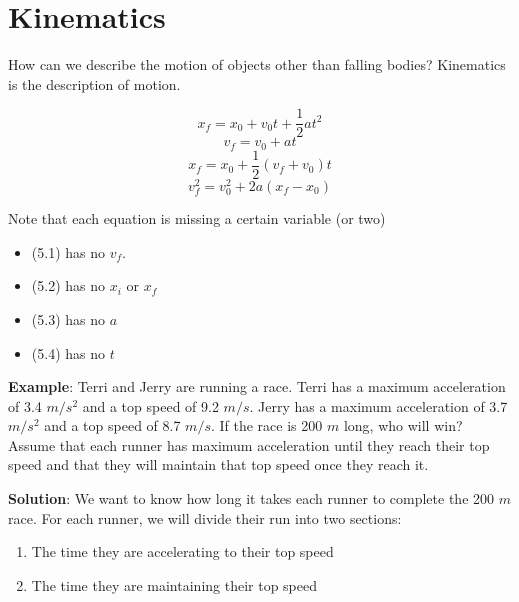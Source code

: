 \chapter{Kinematics}

How can we describe the motion of objects other than falling bodies? Kinematics 
is the description of motion. 



\begin{mdframed}[style=important]
\begin{equation}
    x_f = x_0 + v_0 t + \frac{1}{2}at^2
\end{equation}
\begin{equation}
    v_f = v_0 + at
\end{equation}
\begin{equation}
    x_f = x_0 + \frac{1}{2}\left(v_f + v_0 \right)t
\end{equation}
\begin{equation}
    v_f^2 = v_0^2 + 2a\left(x_f - x_0 \right)
\end{equation}
\end{mdframed}




Note that each equation is missing a certain variable (or two)
\begin{itemize}
    \item (5.1) has no $v_f$. 
    \item (5.2) has no $x_i$ or $x_f$
    \item (5.3) has no $a$
    \item (5.4) has no $t$
\end{itemize} 

\textbf{Example}: Terri and Jerry are running a race. Terri has a maximum 
acceleration of 3.4 $m/s^2$ and a top speed of 9.2 $m/s$. Jerry has a maximum 
acceleration of 3.7 $m/s^2$ and a top speed of 8.7 $m/s$. If the race is 200 $m$ 
long, who will win? Assume that each runner has maximum acceleration until they 
reach their top speed and that they will maintain that top speed once they reach 
it. 

\textbf{Solution}: We want to know how long it takes each runner to complete the 
200 $m$ race. For each runner, we will divide their run into two sections:
\begin{enumerate}
\item The time they are accelerating to their top speed
\item The time they are maintaining their top speed
\end{enumerate}

